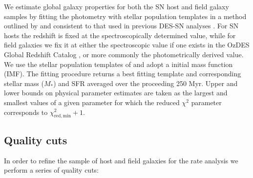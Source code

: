 \documentclass[fleqn,usenatbib]{mnras}
\begin{document}
We estimate global galaxy properties for both the SN host and field galaxy samples by fitting the photometry with stellar population templates in a method outlined by \citet{Sullivan2006} and consistent to that used in previous DES-SN analyses \citep{Kelsey2020,Smith2020,Wiseman2020}. For SN hosts the redshift is fixed at the spectroscopically determined value, while for field galaxies we fix it at either the spectroscopic value if one exists in the OzDES Global Redshift Catalog \citep{Lidman2020}, or more commonly the photometrically derived value. We use the stellar population templates of \citet{Bruzual2003} and adopt a \citet{Chabrier2003} initial mass function (IMF). The fitting procedure returns a best fitting template and corresponding stellar mass ($M_*$) and SFR averaged over the proceeding 250 Myr. Upper and lower bounds on physical parameter estimates are taken as the largest and smallest values of a given parameter for which the reduced $\chi^2$ parameter corresponds to $\chi^2_{\mathrm{red, min}} +1$. %

\subsection{Quality cuts \label{subsec:cuts}}

In order to refine the sample of host and field galaxies for the rate analysis we perform a series of quality cuts:
\end{document}
